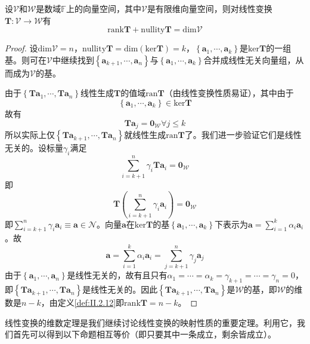 \documentclass[main.tex]{subfiles}
\begin{document}
\begin{theorem}[线性变换的维数定理]\label{thm:II.2.8}
    设$\mathcal{V}$和$\mathcal{W}$是数域$\mathbb{F}$上的向量空间，其中$\mathcal{V}$是有限维向量空间，则对线性变换$\mathbf{T}:\mathcal{V}\rightarrow\mathcal{W}$有
    \[
        \mathrm{rank}\mathbf{T}+\mathrm{nullity}\mathbf{T}=\mathrm{dim}\mathcal{V}
    \]
\end{theorem}
\begin{proof}
    设$\mathrm{dim}\mathcal{V}=n$，$\mathrm{nullity}\mathbf{T}=\mathrm{dim}\left(\mathrm{ker}\mathbf{T}\right)=k$，$\left\{\mathbf{a}_1,\cdots,\mathbf{a}_k\right\}$是$\mathrm{ker}\mathbf{T}$的一组基。则可在$\mathcal{V}$中继续找到$\left\{\mathbf{a}_{k+1},\cdots,\mathbf{a}_{n}\right\}$与$\left\{\mathbf{a}_1,\cdots,\mathbf{a}_k\right\}$合并成线性无关向量组，从而成为$\mathcal{V}$的基。

    由于$\left\{\mathbf{Ta}_1,\cdots,\mathbf{Ta}_n\right\}$线性生成$\mathbf{T}$的值域$\mathrm{ran}\mathbf{T}$（由线性变换性质易证），其中由于
    \[\left\{\mathbf{a}_1,\cdots,\mathbf{a}_k\right\}\in\mathrm{ker}\mathbf{T}\]
    故有
    \[\mathbf{Ta}_j=\mathbf{0}_\mathcal{W}\forall j\leq k\]
    所以实际上仅$\left\{\mathbf{Ta}_{k+1},\cdots,\mathbf{Ta}_n\right\}$就线性生成$\mathrm{ran}\mathbf{T}$了。我们进一步验证它们是线性无关的。设标量$\gamma_i$满足
    \[\sum_{i=k+1}^n\gamma_i\mathbf{Ta}_i=\mathbf{0}_\mathcal{W}\]
    即
    \[\mathbf{T}\left(\sum_{i=k+1}^n\gamma_i\mathbf{a}_i\right)=\mathbf{0}_\mathcal{W}\]
    即$\sum_{i=k+1}^n\gamma_i\mathbf{a}_i\equiv\mathbf{a}\in\mathcal{N}$。向量$\mathbf{a}$在$\mathrm{ker}\mathbf{T}$的基$\left\{\mathbf{a}_1,\cdots,\mathbf{a}_k\right\}$下表示为$\mathbf{a}=\sum_{i=1}^k\alpha_i\mathbf{a}_i$。故
    \[
        \mathbf{a}=\sum_{i=1}^k\alpha_i\mathbf{a}_i=\sum_{j=k+1}^n\gamma_j\mathbf{a}_j
    \]
    由于$\left\{\mathbf{a}_1,\cdots,\mathbf{a}_n\right\}$是线性无关的，故有且只有$\alpha_1=\cdots=\alpha_k=\gamma_{k+1}=\cdots=\gamma_n=0$，即$\left\{\mathbf{Ta}_{k+1},\cdots,\mathbf{Ta}_n\right\}$是线性无关的。因此$\left\{\mathbf{Ta}_{k+1},\cdots,\mathbf{Ta}_n\right\}$是$\mathcal{W}$的基，即$\mathcal{W}$的维数是$n-k$，由定义\ref{def:II.2.12}即$\mathrm{rank}\mathbf{T}=n-k$。
\end{proof}

线性变换的维数定理是我们继续讨论线性变换的映射性质的重要定理。利用它，我们首先可以得到以下命题相互等价（即只要其中一条成立，剩余皆成立）。
\end{document}
